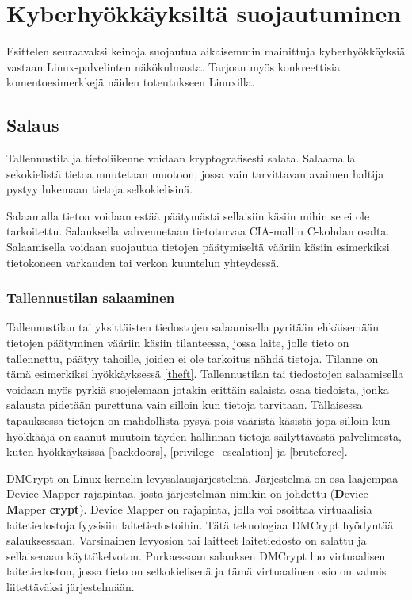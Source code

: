 \chapter{Kyberhyökkäyksiltä suojautuminen}\label{suojautuminen}

Esittelen seuraavaksi keinoja suojautua aikaisemmin mainittuja kyberhyökkäyksiä vastaan Linux-palvelinten näkökulmasta. Tarjoan myös konkreettisia komentoesimerkkejä näiden toteutukseen Linuxilla.

\section{Salaus}\label{Salaus}
Tallennustila ja tietoliikenne voidaan kryptografisesti salata. Salaamalla sekokielistä tietoa muutetaan muotoon, jossa vain tarvittavan avaimen haltija pystyy lukemaan tietoja selkokielisinä.

Salaamalla tietoa voidaan estää päätymästä sellaisiin käsiin mihin se ei ole tarkoitettu. Salauksella vahvennetaan tietoturvaa CIA-mallin C-kohdan osalta. Salaamisella voidaan suojautua tietojen päätymiseltä vääriin käsiin esimerkiksi tietokoneen varkauden tai verkon kuuntelun yhteydessä.~\cite{stamp2011information}

\subsection{Tallennustilan salaaminen}\label{tallennustilan_salaaminen}
Tallennustilan tai yksittäisten tiedostojen salaamisella pyritään ehkäisemään tietojen päätyminen vääriin käsiin tilanteessa, jossa laite, jolle tieto on tallennettu, päätyy tahoille, joiden ei ole tarkoitus nähdä tietoja. Tilanne on tämä esimerkiksi hyökkäyksessä \ref{theft}. Tallennustilan tai tiedostojen salaamisella voidaan myös pyrkiä suojelemaan jotakin erittäin salaista osaa tiedoista, jonka salausta pidetään purettuna vain silloin kun tietoja tarvitaan. Tällaisessa tapauksessa tietojen on mahdollista pysyä pois vääristä käsistä jopa silloin kun hyökkääjä on saanut muutoin täyden hallinnan tietoja säilyttävästä palvelimesta, kuten hyökkäyksissä \ref{backdoors}, \ref{privilege_escalation} ja \ref{bruteforce}.~\cite{stamp2011information}

DMCrypt on Linux-kernelin levysalausjärjestelmä. Järjestelmä on osa laajempaa Device Mapper rajapintaa, josta järjestelmän nimikin on johdettu (\textbf{D}evice \textbf{M}apper \textbf{crypt}). Device Mapper on rajapinta, jolla voi osoittaa virtuaalisia laitetiedostoja fyysisiin laitetiedostoihin. Tätä teknologiaa DMCrypt hyödyntää salauksessaan. Varsinainen levyosion tai laitteet laitetiedosto on salattu ja sellaisenaan käyttökelvoton. Purkaessaan salauksen DMCrypt luo virtuaalisen laitetiedoston, jossa tieto on selkokielisenä ja tämä virtuaalinen osio on valmis liitettäväksi järjestelmään.

